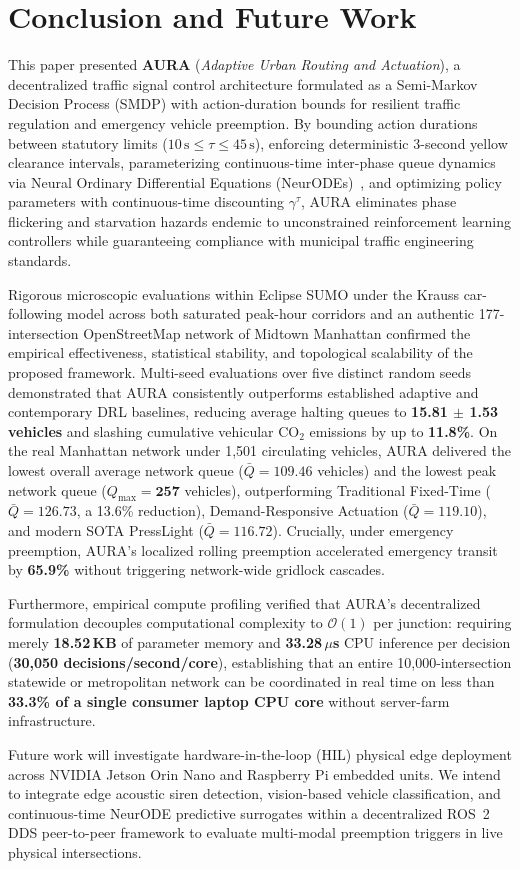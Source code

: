 \section{Conclusion and Future Work}
\label{sec:conclusion}

This paper presented \textbf{AURA} (\textit{Adaptive Urban Routing and Actuation}), a decentralized traffic signal control architecture formulated as a Semi-Markov Decision Process (SMDP) with action-duration bounds for resilient traffic regulation and emergency vehicle preemption. By bounding action durations between statutory limits ($10\,\text{s} \le \tau \le 45\,\text{s}$), enforcing deterministic 3-second yellow clearance intervals, parameterizing continuous-time inter-phase queue dynamics via Neural Ordinary Differential Equations (NeurODEs)~\cite{chen2018neural}, and optimizing policy parameters with continuous-time discounting $\gamma^\tau$, AURA eliminates phase flickering and starvation hazards endemic to unconstrained reinforcement learning controllers while guaranteeing compliance with municipal traffic engineering standards.

Rigorous microscopic evaluations within Eclipse SUMO under the Krauss car-following model across both saturated peak-hour corridors and an authentic 177-intersection OpenStreetMap network of Midtown Manhattan confirmed the empirical effectiveness, statistical stability, and topological scalability of the proposed framework. Multi-seed evaluations over five distinct random seeds demonstrated that AURA consistently outperforms established adaptive and contemporary DRL baselines, reducing average halting queues to \textbf{15.81 $\pm$ 1.53 vehicles} and slashing cumulative vehicular $\text{CO}_2$ emissions by up to \textbf{11.8\%}. On the real Manhattan network under 1,501 circulating vehicles, AURA delivered the lowest overall average network queue ($\bar{Q} = \mathbf{109.46}$ vehicles) and the lowest peak network queue ($Q_{\max} = \mathbf{257}$ vehicles), outperforming Traditional Fixed-Time ($\bar{Q} = 126.73$, a 13.6\% reduction), Demand-Responsive Actuation ($\bar{Q} = 119.10$), and modern SOTA PressLight ($\bar{Q} = 116.72$). Crucially, under emergency preemption, AURA's localized rolling preemption accelerated emergency transit by \textbf{65.9\%} without triggering network-wide gridlock cascades.

Furthermore, empirical compute profiling verified that AURA's decentralized formulation decouples computational complexity to $\mathcal{O}(1)$ per junction: requiring merely \textbf{18.52\,KB} of parameter memory and \textbf{33.28\,$\mu$s} CPU inference per decision (\textbf{30,050 decisions/second/core}), establishing that an entire 10,000-intersection statewide or metropolitan network can be coordinated in real time on less than \textbf{33.3\% of a single consumer laptop CPU core} without server-farm infrastructure.

Future work will investigate hardware-in-the-loop (HIL) physical edge deployment across NVIDIA Jetson Orin Nano and Raspberry Pi embedded units. We intend to integrate edge acoustic siren detection, vision-based vehicle classification, and continuous-time NeurODE predictive surrogates within a decentralized ROS~2 DDS peer-to-peer framework to evaluate multi-modal preemption triggers in live physical intersections.
